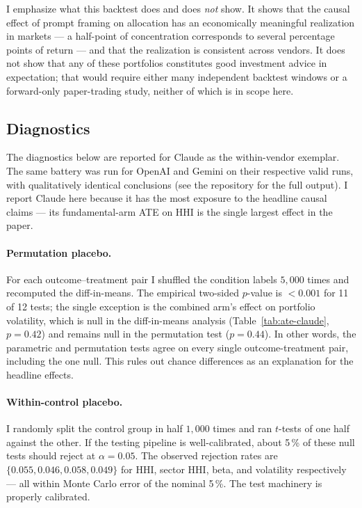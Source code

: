 \documentclass[11pt]{article}
\begin{document}
I emphasize what this backtest does and does \emph{not} show. It shows
that the causal effect of prompt framing on allocation has an
economically meaningful realization in markets --- a half-point of
concentration corresponds to several percentage points of return ---
and that the realization is consistent across vendors. It does not
show that any of these portfolios constitutes good investment advice
in expectation; that would require either many independent backtest
windows or a forward-only paper-trading study, neither of which is in
scope here.

\subsection{Diagnostics}

The diagnostics below are reported for Claude as the within-vendor
exemplar. The same battery was run for OpenAI and Gemini on
their respective valid runs, with qualitatively identical conclusions
(see the repository for the full output). I report Claude here because
it has the most exposure to the headline causal claims --- its
fundamental-arm ATE on HHI is the single largest effect in the paper.

\paragraph{Permutation placebo.} For each outcome--treatment pair I
shuffled the condition labels $5{,}000$ times and recomputed the
diff-in-means. The empirical two-sided $p$-value is $<0.001$ for 11
of 12 tests; the single exception is the combined arm's effect on
portfolio volatility, which is null in the diff-in-means analysis
(Table~\ref{tab:ate-claude}, $p=0.42$) and remains null in the
permutation test ($p=0.44$). In other words, the parametric and
permutation tests agree on every single outcome-treatment pair,
including the one null. This rules out chance differences as an
explanation for the headline effects.

\paragraph{Within-control placebo.} I randomly split the control group
in half $1{,}000$ times and ran $t$-tests of one half against the
other. If the testing pipeline is well-calibrated, about 5\,\% of
these null tests should reject at $\alpha = 0.05$. The observed
rejection rates are $\{0.055, 0.046, 0.058, 0.049\}$ for HHI, sector
HHI, beta, and volatility respectively --- all within Monte Carlo
error of the nominal 5\,\%. The test machinery is properly
calibrated.
\end{document}
